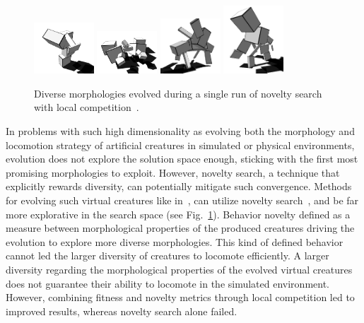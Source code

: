 \begin{figure}[t!]
\centering
\includegraphics[width=0.2\textwidth]{../Figures/Misc/nov1.png}
\includegraphics[width=0.2\textwidth]{../Figures/Misc/nov2.png}
\includegraphics[width=0.2\textwidth]{../Figures/Misc/nov3.png}
\includegraphics[width=0.2\textwidth]{../Figures/Misc/nov4.png}
\caption{Diverse morphologies evolved during a single run of novelty search with local competition~\citep{lehman2011evolving}.}
\label{fig:noveltySims}
\end{figure}

In problems with such high dimensionality as evolving both the morphology and locomotion strategy of artificial creatures in simulated or physical environments, evolution does not explore the solution space enough, sticking with the first most promising morphologies to exploit. However, novelty search, a technique that explicitly rewards diversity, can potentially mitigate such convergence. Methods for evolving such virtual creatures like in~\citep{sims1994evolving}, can utilize novelty search~\citep{lehman2011evolving}, and be far more explorative in the search space (see Fig.~\ref{fig:noveltySims}). Behavior novelty defined as a measure between morphological properties of the produced creatures driving the evolution to explore more diverse morphologies. This kind of defined behavior cannot led the larger diversity of creatures to locomote efficiently. A larger diversity regarding the morphological properties of the evolved virtual creatures does not guarantee their ability to locomote in the simulated environment. However, combining fitness and novelty metrics through local competition led to improved results, whereas novelty search alone failed. 

